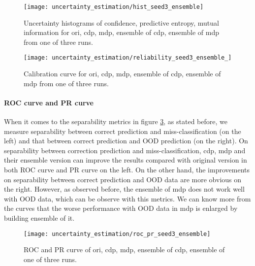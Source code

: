 \begin{figure}[h!]
	\begin{center}
		\texttt{[image: uncertainty\_estimation/hist\_seed3\_ensemble]}
		\caption{Uncertainty histograms of confidence, predictive entropy, mutual information for ori, cdp, mdp, ensemble of cdp, ensemble of mdp from one of three runs.}		
		\label{exp2_histo}
	\end{center}
\end{figure}
\begin{figure}[H]
	\begin{center}
		\texttt{[image: uncertainty\_estimation/reliability\_seed3\_ensemble\_]}
		\caption{Calibration curve for ori, cdp, mdp, ensemble of cdp, ensemble of mdp from one of three runs.}		
		\label{exp2_reliability}
	\end{center}
\end{figure}

\paragraph{ROC curve and PR curve}
When it comes to the separability metrics in figure \ref{exp2_roc_pr}, as stated before, we measure separability between correct prediction and miss-classification (on the left) and that between correct prediction and OOD prediction (on the right). On separability between correction prediction and miss-classification, cdp, mdp and their ensemble version can improve the results compared with original version in both ROC curve and PR curve on the left. On the other hand, the improvements on separability between correct prediction and OOD data are more obvious on the right. However, as observed before, the ensemble of mdp does not work well with OOD data, which can be observe with this metrics. We can know more from the curves that the worse performance with OOD data in mdp is enlarged by building ensemble of it.    

\begin{figure}[h!]
	\begin{center}
		\texttt{[image: uncertainty\_estimation/roc\_pr\_seed3\_ensemble]}
		\caption{ROC and PR curve of ori, cdp, mdp, ensemble of cdp, ensemble of one of three runs.}		
		\label{exp2_roc_pr}
	\end{center} 
\end{figure}

